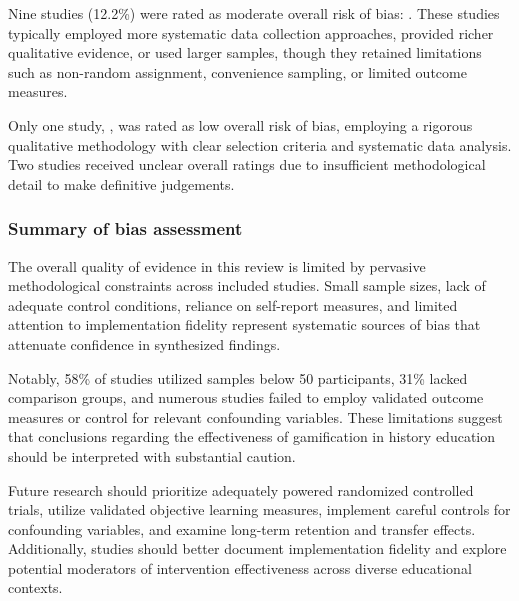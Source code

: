 \documentclass[a4paper,fleqn]{cas-sc}
\begin{document}
Nine studies (12.2\%) were rated as moderate overall risk of bias: \citet{3Watson2011466, 4Cruz2017, 5kazanidis2018alpha, 11Ternblad2023115, 12Gilbert2019108, 36Scholz2021, 55Squire2004, 56Akkerman2009449, 61Karsenti202027}. These studies typically employed more systematic data collection approaches, provided richer qualitative evidence, or used larger samples, though they retained limitations such as non-random assignment, convenience sampling, or limited outcome measures.


Only one study, \citet{15Slater2022}, was rated as low overall risk of bias, employing a rigorous qualitative methodology with clear selection criteria and systematic data analysis. Two studies \citep{76Corbeil2011462, 79Fernes2024379} received unclear overall ratings due to insufficient methodological detail to make definitive judgements.

\subsubsection{Summary of bias assessment}

The overall quality of evidence in this review is limited by pervasive methodological constraints across included studies. Small sample sizes, lack of adequate control conditions, reliance on self-report measures, and limited attention to implementation fidelity represent systematic sources of bias that attenuate confidence in synthesized findings.

Notably, 58\% of studies utilized samples below 50 participants, 31\% lacked comparison groups, and numerous studies failed to employ validated outcome measures or control for relevant confounding variables. These limitations suggest that conclusions regarding the effectiveness of gamification in history education should be interpreted with substantial caution.

Future research should prioritize adequately powered randomized controlled trials, utilize validated objective learning measures, implement careful controls for confounding variables, and examine long-term retention and transfer effects. Additionally, studies should better document implementation fidelity and explore potential moderators of intervention effectiveness across diverse educational contexts.
\end{document}
